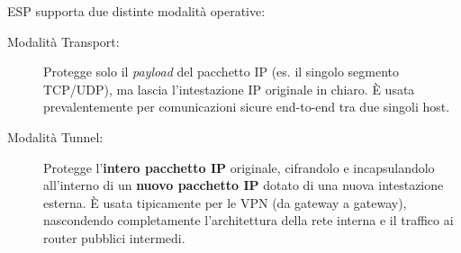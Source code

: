 ESP supporta due distinte modalità operative:
\begin{description}
    \item[Modalità Transport:] Protegge solo il \textit{payload} del pacchetto IP (es. il singolo segmento TCP/UDP), ma lascia l'intestazione IP originale in chiaro. È usata prevalentemente per comunicazioni sicure end-to-end tra due singoli host.
    \item[Modalità Tunnel:] Protegge l'\textbf{intero pacchetto IP} originale, cifrandolo e incapsulandolo all'interno di un \textbf{nuovo pacchetto IP} dotato di una nuova intestazione esterna. È usata tipicamente per le VPN (da gateway a gateway), nascondendo completamente l'architettura della rete interna e il traffico ai router pubblici intermedi.
\end{description}
